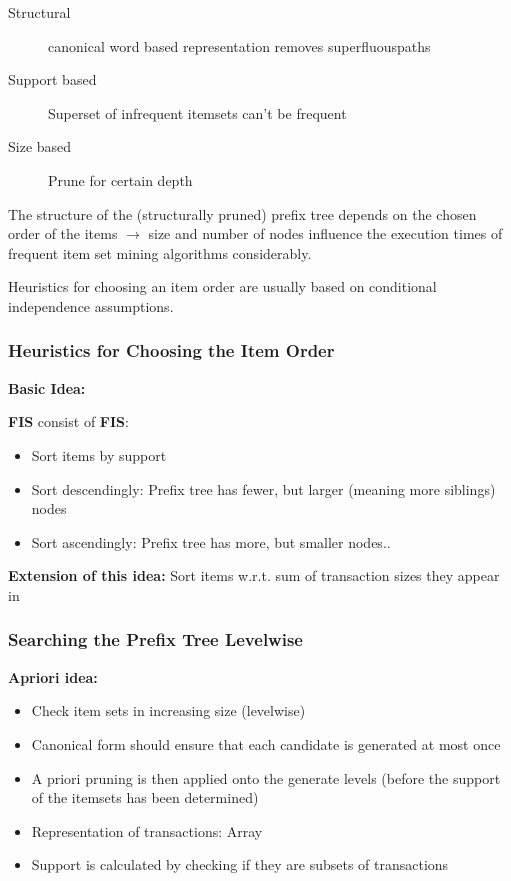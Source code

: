 \documentclass[fleqn, oneside, 10pt, titlepage]{article}
\begin{document}
\begin{description}
\item[Structural] canonical word based representation removes superfluouspaths
\item[Support based] Superset of infrequent itemsets can't be frequent
\item[Size based] Prune for certain depth
\end{description}

The structure of the (structurally pruned) prefix tree depends on the chosen order of the items $\rightarrow$ size and number of nodes influence the execution times of frequent item set mining algorithms considerably.

Heuristics for choosing an item order are usually based on conditional independence assumptions.

\subsubsection{Heuristics for Choosing the Item Order}
\textbf{Basic Idea:}

\textbf{FIS} consist of \textbf{FIS}:
\begin{itemize}
	\item Sort items by support
	\item Sort descendingly: Prefix tree has fewer, but larger (meaning more siblings) nodes
	\item Sort ascendingly: Prefix tree has more, but smaller nodes..
\end{itemize}

\textbf{Extension of this idea:} Sort items w.r.t. sum of transaction sizes they appear in

\subsubsection{Searching the Prefix Tree Levelwise}
\textbf{Apriori idea:}

\begin{itemize}
	\item Check item sets in increasing size (levelwise)
	\item Canonical form should ensure that each candidate is generated at most once
	\item A priori pruning is then applied onto the generate levels (before the support of the itemsets has been determined)
	\item Representation of transactions: Array
	\item Support is calculated by checking if they are subsets of  transactions
\end{itemize}
\end{document}
